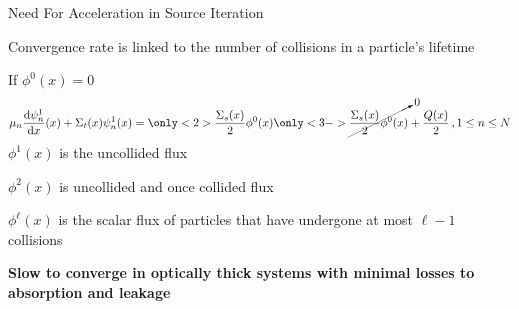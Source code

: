 \documentclass[10pt]{beamer}
\newcommand{\ud}{\mathop{}\!\mathrm{d}} %
\newcommand{\dderiv}[2]{\frac{\ud #1}{\ud #2}}
\begin{document}
\begin{frame}{Need For Acceleration in Source Iteration}

	Convergence rate is linked to the number of collisions in a particle's lifetime

    If $\phi^0(x) = 0$
    \begin{equation*}
        \mu_n \dderiv{\psi_n^{1}}{x}(x) + \Sigma_t(x) \psi_n^{1}(x) =
        \vphantom{\cancelto{0}{\frac{\Sigma_s(x)}{2} \phi^{0}(x)}} 
        \only<2>{\frac{\Sigma_s(x)}{2} \phi^{0}(x)}
        \only<3->{\cancelto{0}{\frac{\Sigma_s(x)}{2} \phi^{0}(x)}}
         + \frac{Q(x)}{2} \,, 1 \leq n \leq N 
    \end{equation*}
    $\phi^1(x) $ is the uncollided flux 

    $\phi^2(x)$ is uncollided and once collided flux 

    $\phi^{\ell}(x)$ is the scalar flux of particles that have undergone at most $\ell - 1$ collisions 

    \textbf{Slow to converge in optically thick systems with minimal losses to absorption and leakage}

\end{frame}







\end{document}
